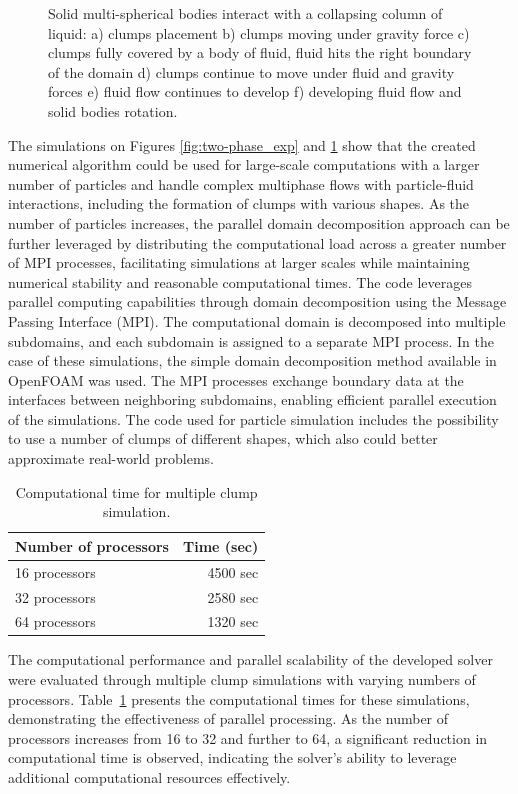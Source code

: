 \begin{figure}[H]
\begin{minipage}{.4\textwidth}
    \end{minipage}
    \caption{Solid multi-spherical bodies interact with a collapsing column of liquid: a) clumps placement b) clumps moving under gravity force c) clumps fully covered by a body of fluid, fluid hits the right boundary of the domain d) clumps continue to move under fluid and gravity forces e) fluid flow continues to develop f) developing fluid flow and solid bodies rotation.}
    \label{fig:two-phase_exp_clumps}
\end{figure}




The simulations on Figures \ref{fig:two-phase_exp} and \ref{fig:two-phase_exp_clumps} show that the created numerical algorithm could be used for large-scale computations with a larger number of particles and handle complex multiphase flows with particle-fluid interactions, including the formation of clumps with various shapes. As the number of particles increases, the parallel domain decomposition approach can be further leveraged by distributing the computational load across a greater number of MPI processes, facilitating simulations at larger scales while maintaining numerical stability and reasonable computational times. The code leverages parallel computing capabilities through domain decomposition using the Message Passing Interface (MPI). The computational domain is decomposed into multiple subdomains, and each subdomain is assigned to a separate MPI process. In the case of these simulations, the simple domain decomposition method available in OpenFOAM was used. The MPI processes exchange boundary data at the interfaces between neighboring subdomains, enabling efficient parallel execution of the simulations. The code used for particle simulation \cite{LIGGGHTS} includes the possibility to use a number of clumps of different shapes, which also could better approximate real-world problems.

\begin{table}[H]
    \centering
    \caption{Computational time for multiple clump simulation.} \label{table4-chap4}
    \begin{tabular}{lr}
        \toprule
        \hline
       Number of processors     & Time (sec)\\
        \hline
        \midrule
        16 processors &  4500 sec \\
        32 processors &   2580 sec\\
        64 processors &   1320 sec\\
                                \hline
        \bottomrule
     \end{tabular}
\end{table}
The computational performance and parallel scalability of the developed solver were evaluated through multiple clump simulations with varying numbers of processors. Table~\ref{table4-chap4} presents the computational times for these simulations, demonstrating the effectiveness of parallel processing. As the number of processors increases from 16 to 32 and further to 64, a significant reduction in computational time is observed, indicating the solver's ability to leverage additional computational resources effectively.

